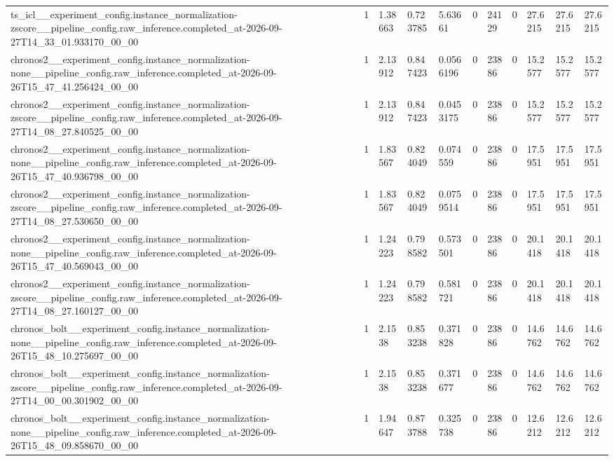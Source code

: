 \begin{tabular}{lllllllllll}
ts\_icl\_\_experiment\_config.instance\_normalization-zscore\_\_pipeline\_config.raw\_inference.completed\_at-2026-09-27T14\_33\_01.933170\_00\_00 & 1 & 1.38663 & 0.723785 & 5.63661 & 0 & 24129 & 0 & 27.6215 & 27.6215 & 27.6215 \\
chronos2\_\_experiment\_config.instance\_normalization-none\_\_pipeline\_config.raw\_inference.completed\_at-2026-09-26T15\_47\_41.256424\_00\_00 & 1 & 2.13912 & 0.847423 & 0.0566196 & 0 & 23886 & 0 & 15.2577 & 15.2577 & 15.2577 \\
chronos2\_\_experiment\_config.instance\_normalization-zscore\_\_pipeline\_config.raw\_inference.completed\_at-2026-09-27T14\_08\_27.840525\_00\_00 & 1 & 2.13912 & 0.847423 & 0.0453175 & 0 & 23886 & 0 & 15.2577 & 15.2577 & 15.2577 \\
chronos2\_\_experiment\_config.instance\_normalization-none\_\_pipeline\_config.raw\_inference.completed\_at-2026-09-26T15\_47\_40.936798\_00\_00 & 1 & 1.83567 & 0.824049 & 0.074559 & 0 & 23886 & 0 & 17.5951 & 17.5951 & 17.5951 \\
chronos2\_\_experiment\_config.instance\_normalization-zscore\_\_pipeline\_config.raw\_inference.completed\_at-2026-09-27T14\_08\_27.530650\_00\_00 & 1 & 1.83567 & 0.824049 & 0.0759514 & 0 & 23886 & 0 & 17.5951 & 17.5951 & 17.5951 \\
chronos2\_\_experiment\_config.instance\_normalization-none\_\_pipeline\_config.raw\_inference.completed\_at-2026-09-26T15\_47\_40.569043\_00\_00 & 1 & 1.24223 & 0.798582 & 0.573501 & 0 & 23886 & 0 & 20.1418 & 20.1418 & 20.1418 \\
chronos2\_\_experiment\_config.instance\_normalization-zscore\_\_pipeline\_config.raw\_inference.completed\_at-2026-09-27T14\_08\_27.160127\_00\_00 & 1 & 1.24223 & 0.798582 & 0.581721 & 0 & 23886 & 0 & 20.1418 & 20.1418 & 20.1418 \\
chronos\_bolt\_\_experiment\_config.instance\_normalization-none\_\_pipeline\_config.raw\_inference.completed\_at-2026-09-26T15\_48\_10.275697\_00\_00 & 1 & 2.1538 & 0.853238 & 0.371828 & 0 & 23886 & 0 & 14.6762 & 14.6762 & 14.6762 \\
chronos\_bolt\_\_experiment\_config.instance\_normalization-zscore\_\_pipeline\_config.raw\_inference.completed\_at-2026-09-27T14\_00\_00.301902\_00\_00 & 1 & 2.1538 & 0.853238 & 0.371677 & 0 & 23886 & 0 & 14.6762 & 14.6762 & 14.6762 \\
chronos\_bolt\_\_experiment\_config.instance\_normalization-none\_\_pipeline\_config.raw\_inference.completed\_at-2026-09-26T15\_48\_09.858670\_00\_00 & 1 & 1.94647 & 0.873788 & 0.325738 & 0 & 23886 & 0 & 12.6212 & 12.6212 & 12.6212 \\

\end{tabular}

